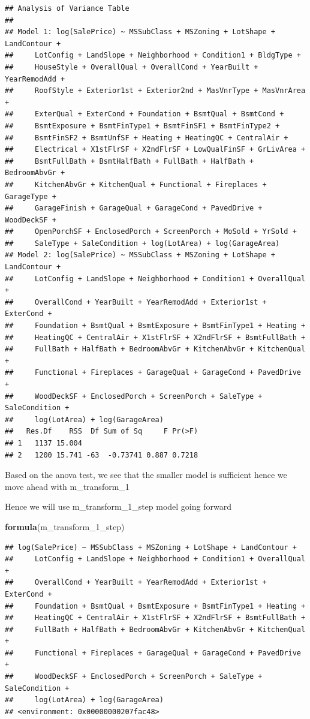 \documentclass[
]{article}
\newenvironment{Shaded}{\begin{snugshade}}{\end{snugshade}}
\newcommand{\DecValTok}[1]{\textcolor[rgb]{0.00,0.00,0.81}{#1}}
\newcommand{\KeywordTok}[1]{\textcolor[rgb]{0.13,0.29,0.53}{\textbf{#1}}}
\newcommand{\NormalTok}[1]{#1}
\begin{document}
\begin{verbatim}
## Analysis of Variance Table
## 
## Model 1: log(SalePrice) ~ MSSubClass + MSZoning + LotShape + LandContour + 
##     LotConfig + LandSlope + Neighborhood + Condition1 + BldgType + 
##     HouseStyle + OverallQual + OverallCond + YearBuilt + YearRemodAdd + 
##     RoofStyle + Exterior1st + Exterior2nd + MasVnrType + MasVnrArea + 
##     ExterQual + ExterCond + Foundation + BsmtQual + BsmtCond + 
##     BsmtExposure + BsmtFinType1 + BsmtFinSF1 + BsmtFinType2 + 
##     BsmtFinSF2 + BsmtUnfSF + Heating + HeatingQC + CentralAir + 
##     Electrical + X1stFlrSF + X2ndFlrSF + LowQualFinSF + GrLivArea + 
##     BsmtFullBath + BsmtHalfBath + FullBath + HalfBath + BedroomAbvGr + 
##     KitchenAbvGr + KitchenQual + Functional + Fireplaces + GarageType + 
##     GarageFinish + GarageQual + GarageCond + PavedDrive + WoodDeckSF + 
##     OpenPorchSF + EnclosedPorch + ScreenPorch + MoSold + YrSold + 
##     SaleType + SaleCondition + log(LotArea) + log(GarageArea)
## Model 2: log(SalePrice) ~ MSSubClass + MSZoning + LotShape + LandContour + 
##     LotConfig + LandSlope + Neighborhood + Condition1 + OverallQual + 
##     OverallCond + YearBuilt + YearRemodAdd + Exterior1st + ExterCond + 
##     Foundation + BsmtQual + BsmtExposure + BsmtFinType1 + Heating + 
##     HeatingQC + CentralAir + X1stFlrSF + X2ndFlrSF + BsmtFullBath + 
##     FullBath + HalfBath + BedroomAbvGr + KitchenAbvGr + KitchenQual + 
##     Functional + Fireplaces + GarageQual + GarageCond + PavedDrive + 
##     WoodDeckSF + EnclosedPorch + ScreenPorch + SaleType + SaleCondition + 
##     log(LotArea) + log(GarageArea)
##   Res.Df    RSS  Df Sum of Sq     F Pr(>F)
## 1   1137 15.004                           
## 2   1200 15.741 -63  -0.73741 0.887 0.7218
\end{verbatim}

Based on the anova test, we see that the smaller model is sufficient hence we move ahead with m\_transform\_1

Hence we will use m\_transform\_1\_step model going forward

\begin{Shaded}
\begin{Highlighting}[]
\KeywordTok{formula}\NormalTok{(m_transform_}\DecValTok{1}\NormalTok{_step)}
\end{Highlighting}
\end{Shaded}

\begin{verbatim}
## log(SalePrice) ~ MSSubClass + MSZoning + LotShape + LandContour + 
##     LotConfig + LandSlope + Neighborhood + Condition1 + OverallQual + 
##     OverallCond + YearBuilt + YearRemodAdd + Exterior1st + ExterCond + 
##     Foundation + BsmtQual + BsmtExposure + BsmtFinType1 + Heating + 
##     HeatingQC + CentralAir + X1stFlrSF + X2ndFlrSF + BsmtFullBath + 
##     FullBath + HalfBath + BedroomAbvGr + KitchenAbvGr + KitchenQual + 
##     Functional + Fireplaces + GarageQual + GarageCond + PavedDrive + 
##     WoodDeckSF + EnclosedPorch + ScreenPorch + SaleType + SaleCondition + 
##     log(LotArea) + log(GarageArea)
## <environment: 0x00000000207fac48>
\end{verbatim}
\end{document}
